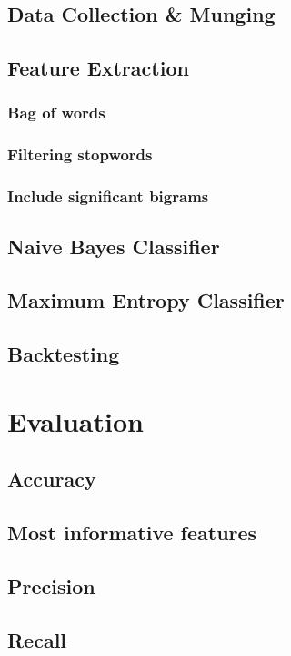 \documentclass[]{article}
\begin{document}
\subsection{Data Collection \& Munging}
\subsection{Feature Extraction}
\subsubsection{Bag of words}
\subsubsection{Filtering stopwords}
\subsubsection{Include significant bigrams}


\subsection{Naive Bayes Classifier}
\subsection{Maximum Entropy Classifier}
\subsection{Backtesting}
\section{Evaluation}
\subsection{Accuracy}

\subsection{Most informative features}

\subsection{Precision}

\subsection{Recall}
\end{document}

